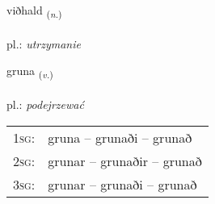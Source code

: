 \documentclass[frontgrid, backgrid]{flacards}\usepackage[]{graphicx}\usepackage[]{xcolor}
\begin{document}
\renewcommand{\flhead}{\vskip5pt \fboxsep=0pt {\small\bfseries\footnotesize Nafnorð | rzeczownik}}
\renewcommand{\fcfoot}{\vskip5pt \fboxsep=0pt \hspace{2pt}{\small\bfseries\footnotesize 3K}}

\renewcommand{\blhead}{\vskip5pt {\small\bfseries\footnotesize Nafnorð | rzeczownik }}
\renewcommand{\bcfoot}{\vskip5pt \hspace{2pt}{\small\bfseries\footnotesize 3K}}


{viðhald \small{\textsubscript{(\textit{n.})}} \\[1ex] %
\textphonetic{[vɪθhalt]} \\
pl.: \emph{utrzymanie} \\  [2ex]
\renewcommand*{\arraystretch}{0.8}
}

\renewcommand{\flhead}{\vskip5pt \fboxsep=0pt {\small\bfseries\footnotesize Sagnorð | czasownik}}
\renewcommand{\fcfoot}{\vskip5pt \fboxsep=0pt \hspace{2pt}{\small\bfseries\footnotesize 3K}}

\renewcommand{\blhead}{\vskip5pt {\small\bfseries\footnotesize Sagnorð | czasownik }}
\renewcommand{\bcfoot}{\vskip5pt \hspace{2pt}{\small\bfseries\footnotesize 3K}}


{gruna \small{\textsubscript{(\textit{v.})}} \\[1ex] %
\textphonetic{[krʏːna]} \\
pl.: \emph{podejrzewać} \\  [2ex]
\renewcommand*{\arraystretch}{0.8}
\begin{tabular}{p{1cm}l}
\textsc{1sg}: & gruna -- grunaði -- grunað \\ 
\textsc{2sg}: & grunar -- grunaðir -- grunað \\ 
\textsc{3sg}: & grunar -- grunaði -- grunað \\ 
\end{tabular}
}
\end{document}
